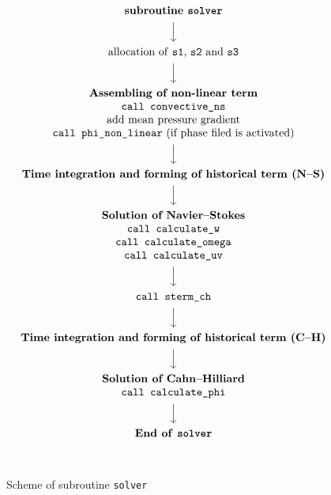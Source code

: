 \begin{figure}[h!]
\centering
\caption{Scheme of subroutine \texttt{solver}}
\label{fig: solver_struct}
\[
\begin{tikzcd}
{\begin{array}{c}\textnormal{\textbf{subroutine \texttt{solver}}}  \end{array}}\arrow[d] \\
{\begin{array}{c}\textnormal{allocation of \texttt{s1}, \texttt{s2} and \texttt{s3}} \end{array}}\arrow[d]\\
{\begin{array}{c} \textnormal{\textbf{Assembling of non-linear term}} \\ \texttt{call convective\_ns}  \\ \textnormal{add mean pressure gradient} \\ \texttt{call phi\_non\_linear} \textnormal{ (if phase filed is activated)} \end{array}}\arrow[d]\\
{\begin{array}{c} \textnormal{\textbf{Time integration and forming of historical term (N--S)}} \end{array} }\arrow[d]\\
{\begin{array}{c} \textnormal{\textbf{Solution of Navier--Stokes}} \\ \texttt{call calculate\_w} \\ \texttt{call calculate\_omega} \\ \texttt{call calculate\_uv} \end{array}}\arrow[d] \\
{\begin{array}{c} \texttt{call sterm\_ch} \end{array}}\arrow[d] \\
{\begin{array}{c} \textnormal{\textbf{Time integration and forming of historical term (C--H)}} \end{array}}\arrow[d]\\
{\begin{array}{c} \textnormal{\textbf{Solution of Cahn--Hilliard}} \\ \texttt{call calculate\_phi} \end{array}}\arrow[d] \\
{\begin{array}{c}\textnormal{\textbf{End of }}\textbf{\texttt{solver}}\end{array}}\\
\end{tikzcd}
\]
\end{figure}
